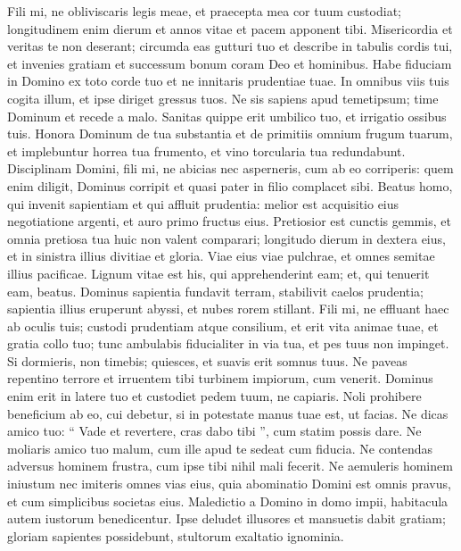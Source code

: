 \begin{biblechapter}
\begin{biblechapter}
\begin{biblechapter}
 \verse Fili mi, ne obliviscaris legis meae,
 et praecepta mea cor tuum custodiat;
 \verse longitudinem enim dierum et annos vitae
 et pacem apponent tibi.
 \verse Misericordia et veritas te non deserant;
 circumda eas gutturi tuo
 et describe in tabulis cordis tui,
 \verse et invenies gratiam et successum bonum
 coram Deo et hominibus.
 \verse Habe fiduciam in Domino ex toto corde tuo
 et ne innitaris prudentiae tuae.
 \verse In omnibus viis tuis cogita illum,
 et ipse diriget gressus tuos.
 \verse Ne sis sapiens apud temetipsum;
 time Dominum et recede a malo.
 \verse Sanitas quippe erit umbilico tuo,
 et irrigatio ossibus tuis.
 \verse Honora Dominum de tua substantia
 et de primitiis omnium frugum tuarum,
 \verse et implebuntur horrea tua frumento,
 et vino torcularia tua redundabunt.
 \verse Disciplinam Domini, fili mi, ne abicias
 nec asperneris, cum ab eo corriperis:
 \verse quem enim diligit, Dominus corripit
 et quasi pater in filio complacet sibi.
 \verse Beatus homo, qui invenit sapientiam
 et qui affluit prudentia:
 \verse melior est acquisitio eius negotiatione argenti,
 et auro primo fructus eius.
 \verse Pretiosior est cunctis gemmis,
 et omnia pretiosa tua huic non valent comparari;
 \verse longitudo dierum in dextera eius,
 et in sinistra illius divitiae et gloria.
 \verse Viae eius viae pulchrae,
 et omnes semitae illius pacificae.
 \verse Lignum vitae est his, qui apprehenderint eam;
 et, qui tenuerit eam, beatus.
 \verse Dominus sapientia fundavit terram,
 stabilivit caelos prudentia;
 \verse sapientia illius eruperunt abyssi,
 et nubes rorem stillant.
 \verse Fili mi, ne effluant haec ab oculis tuis;
 custodi prudentiam atque consilium,
 \verse et erit vita animae tuae,
 et gratia collo tuo;
 \verse tunc ambulabis fiducialiter in via tua,
 et pes tuus non impinget.
 \verse Si dormieris, non timebis;
 quiesces, et suavis erit somnus tuus.
 \verse Ne paveas repentino terrore
 et irruentem tibi turbinem impiorum, cum venerit.
 \verse Dominus enim erit in latere tuo
 et custodiet pedem tuum, ne capiaris.
 \verse Noli prohibere beneficium ab eo, cui debetur,
 si in potestate manus tuae est, ut facias.
 \verse Ne dicas amico tuo: “ Vade et revertere,
 cras dabo tibi ”, cum statim possis dare.
 \verse Ne moliaris amico tuo malum,
 cum ille apud te sedeat cum fiducia.
 \verse Ne contendas adversus hominem frustra,
 cum ipse tibi nihil mali fecerit.
 \verse Ne aemuleris hominem iniustum
 nec imiteris omnes vias eius,
 \verse quia abominatio Domini est omnis pravus,
 et cum simplicibus societas eius.
 \verse Maledictio a Domino in domo impii,
 habitacula autem iustorum benedicentur.
 \verse Ipse deludet illusores
 et mansuetis dabit gratiam;
 \verse gloriam sapientes possidebunt,
 stultorum exaltatio ignominia.
 

\end{biblechapter}
\end{biblechapter}
\end{biblechapter}

